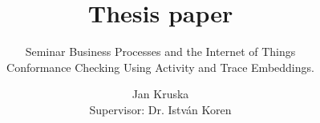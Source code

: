 \documentclass[runningheads]{template/llncs}
\begin{document}
%
\title{Thesis paper}
\subtitle{Seminar Business Processes and the Internet of Things \\ Conformance Checking Using Activity and Trace Embeddings.}
%
%
\author{Jan Kruska \\ Supervisor: Dr. István Koren}
%
%
%
\maketitle              %
%
%
%
%
\end{document}
